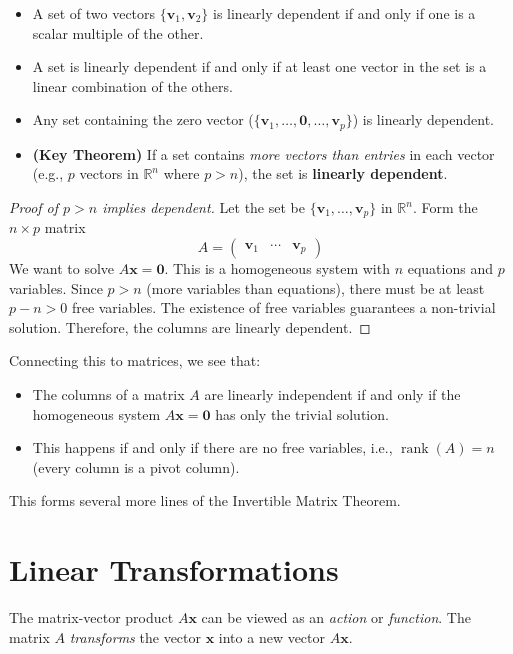 \begin{property}
\begin{itemize}
    \item A set of two vectors $\{\mathbf{v}_1, \mathbf{v}_2\}$ is linearly dependent if and only if one is a scalar multiple of the other.
    \item A set is linearly dependent if and only if at least one vector in the set is a linear combination of the others.
    \item Any set containing the zero vector ($\{\mathbf{v}_1, \ldots, \mathbf{0}, \ldots, \mathbf{v}_p\}$) is linearly dependent.
    \item \textbf{(Key Theorem)} If a set contains \emph{more vectors than entries} in each vector (e.g., $p$ vectors in $\mathbb{R}^n$ where $p > n$), the set is \textbf{linearly dependent}.
\end{itemize}
\end{property}
\begin{proof}[Proof of $p > n$ implies dependent]
Let the set be $\{\mathbf{v}_1, \ldots, \mathbf{v}_p\}$ in $\mathbb{R}^n$.
Form the $n \times p$ matrix 
$$A = \begin{pmatrix} \mathbf{v}_1 & \cdots & \mathbf{v}_p \end{pmatrix}$$
We want to solve $A\mathbf{x} = \mathbf{0}$.
This is a homogeneous system with $n$ equations and $p$ variables.
Since $p > n$ (more variables than equations), there must be at least $p - n > 0$ free variables.
The existence of free variables guarantees a non-trivial solution.
Therefore, the columns are linearly dependent.
\end{proof}

Connecting this to matrices, we see that:
\begin{itemize}
    \item The columns of a matrix $A$ are linearly independent if and only if the homogeneous system $A\mathbf{x} = \mathbf{0}$ has only the trivial solution.
    \item This happens if and only if there are no free variables, i.e., $\operatorname{rank}(A) = n$ (every column is a pivot column).
\end{itemize}
This forms several more lines of the Invertible Matrix Theorem.

\section{Linear Transformations}
The matrix-vector product $A\mathbf{x}$ can be viewed as an \emph{action} or \emph{function}. The matrix $A$ \emph{transforms} the vector $\mathbf{x}$ into a new vector $A\mathbf{x}$.

